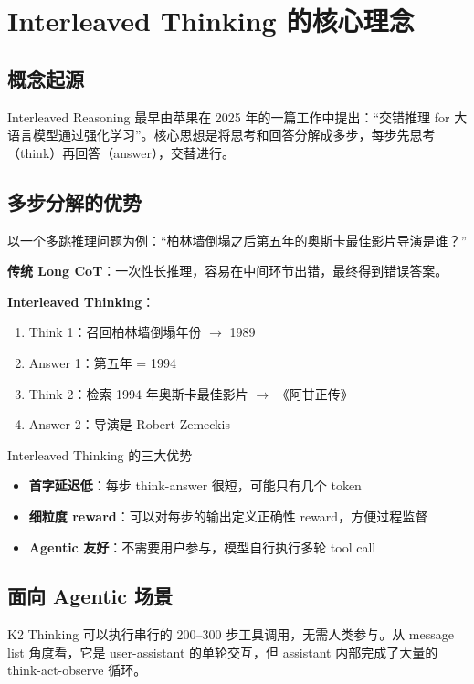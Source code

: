 \documentclass[a4paper]{article}
\begin{document}
\section{Interleaved Thinking 的核心理念}

\subsection{概念起源}

Interleaved Reasoning 最早由苹果在 2025 年的一篇工作中提出：``交错推理 for 大语言模型通过强化学习''。核心思想是将思考和回答分解成多步，每步先思考（think）再回答（answer），交替进行。

\subsection{多步分解的优势}

以一个多跳推理问题为例：``柏林墙倒塌之后第五年的奥斯卡最佳影片导演是谁？''

\textbf{传统 Long CoT}：一次性长推理，容易在中间环节出错，最终得到错误答案。

\textbf{Interleaved Thinking}：
\begin{enumerate}
  \item Think 1：召回柏林墙倒塌年份 $\to$ 1989
  \item Answer 1：第五年 = 1994
  \item Think 2：检索 1994 年奥斯卡最佳影片 $\to$ 《阿甘正传》
  \item Answer 2：导演是 Robert Zemeckis
\end{enumerate}

\begin{importantbox}{Interleaved Thinking 的三大优势}
\begin{itemize}
  \item \textbf{首字延迟低}：每步 think-answer 很短，可能只有几个 token
  \item \textbf{细粒度 reward}：可以对每步的输出定义正确性 reward，方便过程监督
  \item \textbf{Agentic 友好}：不需要用户参与，模型自行执行多轮 tool call
\end{itemize}
\end{importantbox}

\subsection{面向 Agentic 场景}

K2 Thinking 可以执行串行的 200--300 步工具调用，无需人类参与。从 message list 角度看，它是 user-assistant 的单轮交互，但 assistant 内部完成了大量的 think-act-observe 循环。
\end{document}
